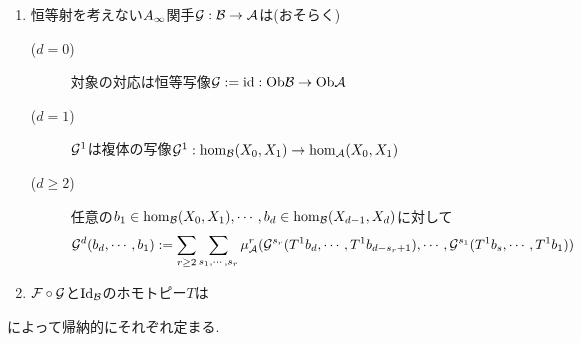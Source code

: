 \documentclass[uplatex, a4paper, 14Q, dvipdfmx]{jsarticle}
\begin{document}
\begin{theorem}[ホモロジー的摂動論]
\begin{enumerate}
    \item 恒等射を考えない$A_{\infty}$関手$\mathcal{G} : \mathcal{B} \to \mathcal{A}$は(おそらく)
    \begin{description}
      \item[($d=0$)] 対象の対応は恒等写像$\mathcal{G} := \mathrm{id} : \mathrm{Ob}\mathcal{B} \to \mathrm{Ob}\mathcal{A}$
      \item[($d=1$)] $\mathcal{G}^1$は複体の写像$\mathcal{G}^1 : \hom_{\mathcal{B}}(X_0,X_1) \to \hom_{\mathcal{A}}(X_0,X_1)$
      \item[($d \geq 2$)] 任意の$b_1 \in \hom_{\mathcal{B}}(X_0,X_1), \cdots, b_d \in \hom_{\mathcal{B}}(X_{d-1},X_d)$に対して
      \begin{align*}
        \mathcal{G}^d(b_d,\cdots,b_1)
        := \sum_{r \geq 2} \sum_{s_1,\cdots,s_r} \mu^r_{\mathcal{A}}(\mathcal{G}^{s_r}(T^1 b_d,\cdots,T^1 b_{d-s_r+1}), \cdots, \mathcal{G}^{s_1}(T^1 b_s,\cdots,T^1 b_1))
      \end{align*}
    \end{description}
    \item $\mathcal{F} \circ \mathcal{G}$と$\mathrm{Id}_{\mathcal{B}}$のホモトピー$T$は
  \end{enumerate}
  によって帰納的にそれぞれ定まる. 
\end{theorem}
\end{document}
